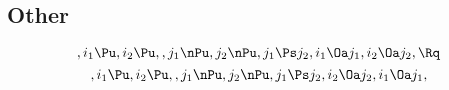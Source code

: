 \subsection{Other}
\[, i_1 \Pu, i_2 \Pu, , j_1 \nPu, j_2 \nPu, j_1 \Ps j_2, i_1 \Oa j_1, i_2 \Oa j_2, \Rq \]
\[, i_1 \Pu, i_2 \Pu, , j_1 \nPu, j_2 \nPu, j_1 \Ps j_2, i_2 \Oa j_2, i_1 \Oa j_1,  \]


\newpage